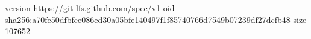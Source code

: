 version https://git-lfs.github.com/spec/v1
oid sha256:a70fe50dfbfee086ed30a05bfe140497f1f85740766d7549b07239df27dcfb48
size 107652
